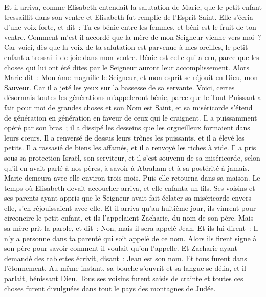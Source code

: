 \begin{multicols}{2}
Et il arriva, comme Elisabeth entendait la salutation de Marie, que le petit enfant tressaillit dans son ventre et Elisabeth fut remplie de l'Esprit Saint.
Elle s'écria d'une voix forte, et dit~: Tu es bénie entre les femmes, et béni est le fruit de ton ventre.
Comment m'est-il accordé que la mère de mon Seigneur vienne vers moi~?
Car voici, dès que la voix de ta salutation est parvenue à mes oreilles, le petit enfant a tressailli de joie dans mon ventre.
Bénie est celle qui a cru, parce que les choses qui lui ont été dites par le Seigneur auront leur accomplissement.
Alors Marie dit~: Mon âme magnifie le Seigneur,
et mon esprit se réjouit en Dieu, mon Sauveur.
Car il a jeté les yeux sur la bassesse de sa servante. Voici, certes désormais toutes les générations m'appeleront bénie,
parce que le Tout-Puissant a fait pour moi de grandes choses et son Nom est Saint,
et sa miséricorde s'étend de génération en génération en faveur de ceux qui le craignent.
Il a puissamment opéré par son bras~; il a dissipé les desseins que les orgueilleux formaient dans leurs cœurs.
Il a renversé de dessus leurs trônes les puissants, et il a élevé les petits.
Il a rassasié de biens les affamés, et il a renvoyé les riches à vide.
Il a pris sous sa protection Israël, son serviteur, et il s'est souvenu de sa miséricorde,
selon qu'il en avait parlé à nos pères, à savoir à Abraham et à sa postérité à jamais.
Marie demeura avec elle environ trois mois. Puis elle retourna dans sa maison.
Le temps où Elisabeth devait accoucher arriva, et elle enfanta un fils.
Ses voisins et ses parents ayant appris que le Seigneur avait fait éclater sa miséricorde envers elle, s'en réjouissaient avec elle.
Et il arriva qu'au huitième jour, ils vinrent pour circoncire le petit enfant, et ils l'appelaient Zacharie, du nom de son père.
Mais sa mère prit la parole, et dit~: Non, mais il sera appelé Jean.
Et ils lui dirent~: Il n'y a personne dans ta parenté qui soit appelé de ce nom.
Alors ils firent signe à son père pour savoir comment il voulait qu'on l'appelle.
Et Zacharie ayant demandé des tablettes écrivit, disant~: Jean est son nom. Et tous furent dans l'étonnement.
Au même instant, sa bouche s'ouvrit et sa langue se délia, et il parlait, bénissant Dieu.
Tous ses voisins furent saisis de crainte et toutes ces choses furent divulguées dans tout le pays des montagnes de Judée.

\end{multicols}
